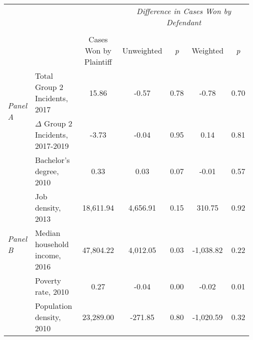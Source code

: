 \begin{tabular}{llccccc}
\toprule
 &  & \textit{} & \multicolumn{4}{c}{\textit{Difference in Cases Won by Defendant}} \\
\cline{4-7}
\\
 &  & Cases Won by Plaintiff & Unweighted & \emph{p} & Weighted & \emph{p} \\
\midrule
\multirow[c]{2}{.75cm}{\textit{Panel A}} & Total Group 2 Incidents, 2017 & 15.86 & -0.57 & 0.78 & -0.78 & 0.70 \\
 & $\Delta$ Group 2 Incidents, 2017-2019 & -3.73 & -0.04 & 0.95 & 0.14 & 0.81 \\
\cline{1-7}
\multirow[c]{5}{.75cm}{\textit{Panel B}} & Bachelor's degree, 2010 & 0.33 & 0.03 & 0.07 & -0.01 & 0.57 \\
 & Job density, 2013 & 18,611.94 & 4,656.91 & 0.15 & 310.75 & 0.92 \\
 & Median household income, 2016 & 47,804.22 & 4,012.05 & 0.03 & -1,038.82 & 0.22 \\
 & Poverty rate, 2010 & 0.27 & -0.04 & 0.00 & -0.02 & 0.01 \\
 & Population density, 2010 & 23,289.00 & -271.85 & 0.80 & -1,020.59 & 0.32 \\
\cline{1-7}
\bottomrule
\end{tabular}
